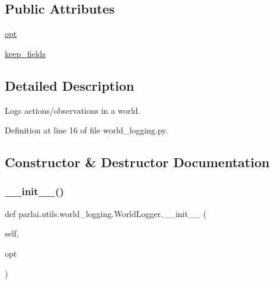 \subsection*{Public Attributes}
\begin{DoxyCompactItemize}
\item 
\hyperlink{classparlai_1_1utils_1_1world__logging_1_1WorldLogger_aaf2ae02c76953a68916b5136c1d2cc31}{opt}
\item 
\hyperlink{classparlai_1_1utils_1_1world__logging_1_1WorldLogger_afbcb1888545753a6bc9e272ab63e8218}{keep\+\_\+fields}
\end{DoxyCompactItemize}


\subsection{Detailed Description}
\begin{DoxyVerb}Logs actions/observations in a world.
\end{DoxyVerb}
 

Definition at line 16 of file world\+\_\+logging.\+py.



\subsection{Constructor \& Destructor Documentation}
\mbox{\label{classparlai_1_1utils_1_1world__logging_1_1WorldLogger_aecf78591417c85526b5f3efb75bbdca1}} 
\subsubsection{\texorpdfstring{\+\_\+\+\_\+init\+\_\+\+\_\+()}{\_\_init\_\_()}}
{\footnotesize\ttfamily def parlai.\+utils.\+world\+\_\+logging.\+World\+Logger.\+\_\+\+\_\+init\+\_\+\+\_\+ (\begin{DoxyParamCaption}\item[{}]{self,  }\item[{}]{opt }\end{DoxyParamCaption})}



